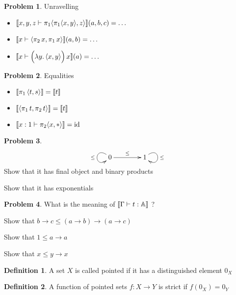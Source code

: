 \documentclass[a4paper, 11pt]{article}
\theoremstyle{definition}
\newtheorem{definition}{Definition}
\newtheorem{problem}{Problem}
\begin{document}
\begin{problem}
        Unravelling
        \begin{itemize}
                \item $\llbracket x,y,z \vdash \pi_1 \langle \pi_1 \langle x, y \rangle, z \rangle \rrbracket(a,b,c) = \dots$ 
                \item $\llbracket x \vdash \langle \pi_2 \, x, \pi_1 \, x \rangle \rrbracket(a,b) = \dots$
                \item $\llbracket x \vdash \Big (\lambda y. \, \langle x, y \rangle \Big ) \, x  \rrbracket (a) = \dots$
        \end{itemize}
\end{problem}

\begin{problem}
        Equalities
        \begin{itemize}
                \item  $\llbracket \pi_1 \, \langle t, s \rangle \rrbracket = \llbracket t \rrbracket$
                \item $\llbracket \langle \pi_1 \, t, \pi_2 \, t \rangle \rrbracket = \llbracket t \rrbracket$
                \item $\llbracket x : 1 \vdash \pi_2 \langle x, \ast \rangle  \rrbracket = \mathrm{id}$
        \end{itemize}
\end{problem}



\begin{problem}
        \[
                \xymatrix@C=40pt{
                        0 \ar[r]^{\leq} \ar@(ul,dl)[]_{\leq} & 1 \ar@(ur,dr)[]^{\leq} 
                }
        \]
        Show that it has final object and binary products

        Show that it has exponentials
\end{problem}

\begin{problem}
        What is the meaning of $\llbracket \Gamma \vdash t : \mathbb{A} \rrbracket$ ?

        Show that $b \to c \leq (a \to b) \to (a \to c)$

        Show that $1 \leq a \to a$

        Show that $x \leq y \to x$
\end{problem}
        \begin{definition}
                A set $X$ is called pointed if it has
                a distinguished element $0_X$
        \end{definition}

        \begin{definition}
                A function of pointed sets $f : X \to Y$ is
                strict if $f(0_X) = 0_Y$
        \end{definition}
\newcommand{\PSet}{\catfont{PSet}}
\end{document}
